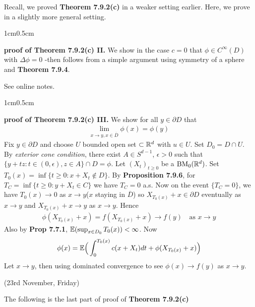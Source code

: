 \documentclass[12pt,a4paper]{report}
\newenvironment{proof}
{\begin{changemargin}{1cm}{0.5cm} 
	}%
	{\end{changemargin}
}
\begin{document}
Recall, we proved \textbf{Theorem 7.9.2(c)} in a weaker setting earlier. Here, we prove in a slightly more general setting.
\begin{proof}
\textbf{proof of Theorem 7.9.2(c) II.} We show in the case $c=0$ that $\phi \in C^{\infty}(D)$ with $\Delta \phi =0$ -then follows from a simple argument using symmetry of a sphere and \textbf{Theorem 7.9.4}.

See online notes.
\end{proof}
\s

\begin{proof}
\textbf{proof of Theorem 7.9.2(c) III.} We show for all $y \in \partial D$ that
\begin{align*}
\lim_{x\rightarrow y, x\in \overline{D}} \phi(x) = \phi(y)
\end{align*}
Fix $y\in \partial D$ and choose $U$ bounded open set $\subset \mathbb{R}^d$ with $u\in U$. Set $D_0 = D \cap U$. By \emph{exterior cone condition}, there exist $A\in S^{d-1}$, $\epsilon>0$ such that $\{y+tz : t \in (0,\epsilon) , z\in A \} \cap D = \phi$. Let $(X_t)_{t\geq 0}$ be a $\text{BM}_0(\mathbb{R}^d)$. Set $T_0(x) = \inf \{ t\geq 0: x+ X_t \not\in D \}$. By \textbf{Proposition 7.9.6}, for $T_C = \inf \{t\geq 0 : y+X_t \in C \}$ we have $T_C =0$ a.s. Now on the event $\{ T_C =0 \}$, we have $T_0(x) \rightarrow 0$ as $x\rightarrow y$($x$ staying in $\overline{D}$) so $X_{T_0(x)} + x \in \partial D$ eventually as $x\rightarrow y$ and $X_{T_0(x)} +x \rightarrow y$ as $x\rightarrow y$. Hence
\begin{align*}
\phi(X_{T_0(x)} +x) = f(X_{T_0(x)} +x) \rightarrow f(y) \quad \text{as }x\rightarrow y
\end{align*}
Also by \textbf{Prop 7.7.1}, $\mathbb{E}(\sup_{x\in D_0} T_0(x)) < \infty$. Now
\begin{align*}
\phi(x) = \mathbb{E} \Big( \int_0^{T_0(x)} c(x+X_t)dt + \phi(X_{T_0(x)} + x) \Big)
\end{align*}
Let $x\rightarrow y$, then using dominated convergence to see $\phi(x) \rightarrow f(y)$ as $x\rightarrow y$.

\eop
\end{proof}
\s

\newday

(23rd November, Friday)
\s

The following is the last part of proof of \textbf{Theorem 7.9.2(c)}
\s
\end{document}
